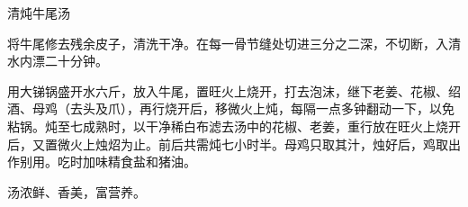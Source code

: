 \begin{recipe}{清炖牛尾汤}

\ingredients



\cooking

将牛尾修去残余皮子，清洗干净。在每一骨节缝处切进三分之二深，不切断，入清水内漂二十分钟。

用大锑锅盛开水六斤，放入牛尾，置旺火上烧开，打去泡沫，继下老姜、花椒、绍酒、母鸡（去头及爪），再行烧开后，移微火上炖，每隔一点多钟翻动一下，以免粘锅。炖至七成熟时，以干净稀白布滤去汤中的花椒、老姜，重行放在旺火上烧开后，又置微火上烛炤为止。前后共需炖七小时半。母鸡只取其汁，烛好后，鸡取出作别用。吃时加味精食盐和猪油。

\notes

汤浓鲜、香美，富营养。

\end{recipe}

